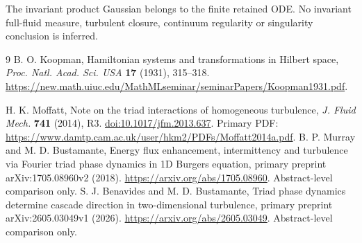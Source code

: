\documentclass[11pt]{article}
\begin{document}
The invariant product Gaussian belongs to the finite retained ODE.
No invariant full-fluid measure, turbulent closure, continuum regularity
or singularity conclusion is inferred.

\begin{thebibliography}{9}
 B. O. Koopman, Hamiltonian systems and transformations
in Hilbert space, \emph{Proc. Natl. Acad. Sci. USA} \textbf{17} (1931), 315--318.
\url{https://new.math.uiuc.edu/MathMLseminar/seminarPapers/Koopman1931.pdf}.

 H. K. Moffatt, Note on the triad interactions of
homogeneous turbulence, \emph{J. Fluid Mech.} \textbf{741} (2014), R3.
\href{https://doi.org/10.1017/jfm.2013.637}{doi:10.1017/jfm.2013.637}.
Primary PDF: \url{https://www.damtp.cam.ac.uk/user/hkm2/PDFs/Moffatt2014a.pdf}.
 B. P. Murray and M. D. Bustamante, Energy flux
enhancement, intermittency and turbulence via Fourier triad phase
dynamics in 1D Burgers equation, primary preprint arXiv:1705.08960v2
(2018). \url{https://arxiv.org/abs/1705.08960}.
Abstract-level comparison only.
 S. J. Benavides and M. D. Bustamante,
Triad phase dynamics determine cascade direction in two-dimensional
turbulence, primary preprint arXiv:2605.03049v1 (2026).
\url{https://arxiv.org/abs/2605.03049}. Abstract-level comparison only.
\end{thebibliography}
\end{document}
